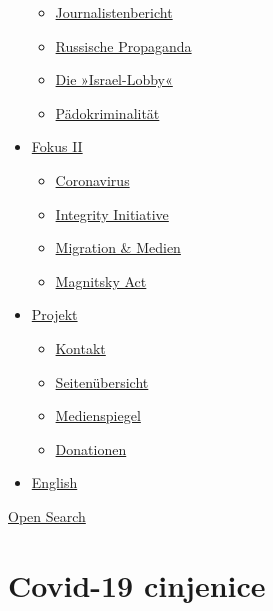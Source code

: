\begin{itemize}
  \begin{itemize}
  \tightlist
  \item
    \href{https://swprs.org/bericht-eines-journalisten/}{Journalistenbericht}
  \item
    \href{https://swprs.org/russische-propaganda/}{Russische Propaganda}
  \item
    \href{https://swprs.org/die-israel-lobby-fakten-und-mythen/}{Die
    »Israel-Lobby«}
  \item
    \href{https://swprs.org/geopolitik-und-paedokriminalitaet/}{Pädokriminalität}
  \end{itemize}
\item
  \href{https://swprs.org/migration-und-medien/}{Fokus II}

  \begin{itemize}
  \tightlist
  \item
    \href{https://swprs.org/covid-19-hinweis-ii/}{Coronavirus}
  \item
    \href{https://swprs.org/die-integrity-initiative/}{Integrity
    Initiative}
  \item
    \href{https://swprs.org/migration-und-medien/}{Migration \& Medien}
  \item
    \href{https://swprs.org/der-fall-magnitsky/}{Magnitsky Act}
  \end{itemize}
\item
  \href{https://swprs.org/kontakt/}{Projekt}

  \begin{itemize}
  \tightlist
  \item
    \href{https://swprs.org/kontakt/}{Kontakt}
  \item
    \href{https://swprs.org/uebersicht/}{Seitenübersicht}
  \item
    \href{https://swprs.org/medienspiegel/}{Medienspiegel}
  \item
    \href{https://swprs.org/donationen/}{Donationen}
  \end{itemize}
\item
  \href{https://swprs.org/contact/}{English}
\end{itemize}

\protect\hyperlink{}{Open Search}

\hypertarget{covid-19-cinjenice}{%
\section{Covid-19 cinjenice}\label{covid-19-cinjenice}}

